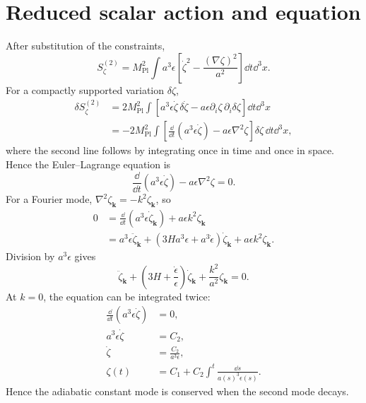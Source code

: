 \section{Reduced scalar action and equation}
After substitution of the constraints,
\begin{equation}
\boxed{
S_\zeta^{(2)}
=M_{\mathrm{Pl}}^2
\int a^3\epsilon
\left[
\dot\zeta^2-\frac{(\nabla\zeta)^2}{a^2}
\right]\dd t\dd^3x.
}
\end{equation}
For a compactly supported variation \(\delta\zeta\),
\begin{align}
\delta S_\zeta^{(2)}
&=2M_{\mathrm{Pl}}^2
\int
\left[
 a^3\epsilon\dot\zeta\,\delta\dot\zeta
-a\epsilon\partial_i\zeta\,\partial_i\delta\zeta
\right]\dd t\dd^3x\\
&=-2M_{\mathrm{Pl}}^2
\int
\left[
\frac{\dd}{\dd t}
\left(a^3\epsilon\dot\zeta\right)
-a\epsilon\nabla^2\zeta
\right]
\delta\zeta\,\dd t\dd^3x,
\end{align}
where the second line follows by integrating once in time and once in space.  Hence the Euler--Lagrange equation is
\begin{equation}
\boxed{
\frac{\dd}{\dd t}
\left(a^3\epsilon\dot\zeta\right)
-a\epsilon\nabla^2\zeta
=0.
}
\end{equation}
For a Fourier mode, \(\nabla^2\zeta_{\bm k}=-k^2\zeta_{\bm k}\), so
\begin{align}
0
&=\frac{\dd}{\dd t}
\left(a^3\epsilon\dot\zeta_{\bm k}\right)
+a\epsilon k^2\zeta_{\bm k}\\
&=a^3\epsilon\ddot\zeta_{\bm k}
+\left(3Ha^3\epsilon+a^3\dot\epsilon\right)
\dot\zeta_{\bm k}
+a\epsilon k^2\zeta_{\bm k}.
\end{align}
Division by \(a^3\epsilon\) gives
\begin{equation}
\ddot\zeta_{\bm k}
+\left(3H+\frac{\dot\epsilon}{\epsilon}\right)
\dot\zeta_{\bm k}
+\frac{k^2}{a^2}\zeta_{\bm k}=0.
\end{equation}
At \(k=0\), the equation can be integrated twice:
\begin{align}
\frac{\dd}{\dd t}
\left(a^3\epsilon\dot\zeta\right)&=0,\\
a^3\epsilon\dot\zeta&=C_2,\\
\dot\zeta&=\frac{C_2}{a^3\epsilon},\\
\zeta(t)&=C_1+C_2\int^t\frac{\dd s}{a(s)^3\epsilon(s)}.
\end{align}
Hence the adiabatic constant mode is conserved when the second mode decays.

